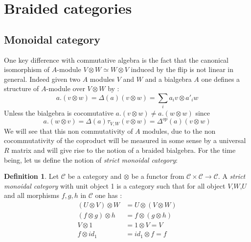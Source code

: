 \documentclass{article}
\theoremstyle{definition}
\newtheorem{Def}{Definition}[section]
\begin{document}
\section{Braided categories}
\subsection{Monoidal category}
One key difference with commutative algebra is the fact that the canonical isomorphism of $A$-module $V\otimes W\simeq W\otimes V$ induced by the flip is not linear in general. Indeed given two $A$ modules $V$ and $W$  and a bialgebra $A$ one defines a structure of $A$-module over $V\otimes W$ by : $$a.(v\otimes w)=\Delta(a)(v\otimes w)=\sum_{i}a_{i}v\otimes a'_{i} w$$ Unless the bialgebra is cocomutative $a.(v\otimes w)\neq a.(w\otimes w) $ since $$a.(w\otimes v)=\Delta(a)\tau_{V,W}(v\otimes w)=\Delta^{op}(a)(v\otimes w)$$ We will see that this non commutativity of $A$ modules, due to the non cocommutativity of the coproduct will be measured in some sense by a universal $R$ matrix and will give rise to the notion of a braided bialgebra. For the time being, let us define the notion of \textit{strict monoidal category}:
\begin{Def} Let $\mathcal{C}$ be a category and $\otimes$ be a functor from $\mathcal{C}\times\mathcal{C}\to \mathcal{C}$. A \textit{strict monoidal category} with unit object 1  is a category such that for all object $V$,$W$,$U$ and all morphisms $f,g,h$ in $\mathcal{C}$ one has : 
\begin{align} 
(U\otimes V)\otimes W & =  U\otimes(V\otimes W) \\
(f\otimes g)\otimes h & = f\otimes(g\otimes h)\\
V\otimes 1 &  = 1\otimes V=V\\
f\otimes id_{1} & = id_{1}\otimes f=f 
\end{align}
\end{Def}
\end{document}
